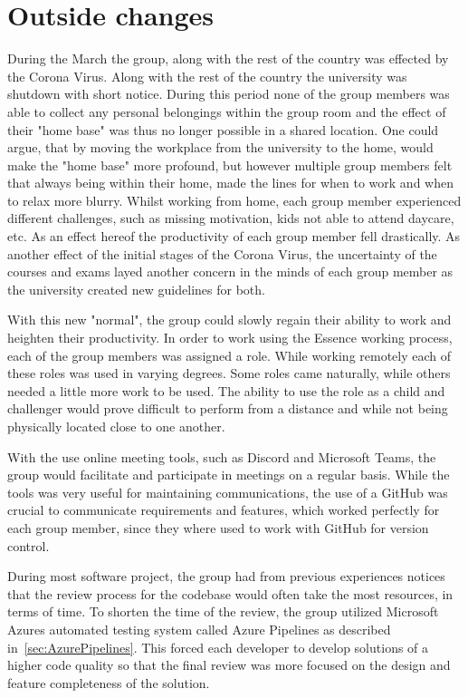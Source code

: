 \section{Outside changes}
During the March the group, along with the rest of the country was effected by the Corona Virus.
Along with the rest of the country the university was shutdown with short notice.
During this period none of the group members was able to collect any personal belongings within the group room and the effect of their "home base" was thus no longer possible in a shared location.
One could argue, that by moving the workplace from the university to the home, would make the "home base" more profound, but however multiple group members felt that always being within their home, made the lines for when to work and when to relax more blurry.
Whilst working from home, each group member experienced different challenges, such as missing motivation, kids not able to attend daycare, etc.
As an effect hereof the productivity of each group member fell drastically.
As another effect of the initial stages of the Corona Virus, the uncertainty of the courses and exams layed another concern in the minds of each group member as the university created new guidelines for both.

With this new "normal", the group could slowly regain their ability to work and heighten their productivity.
In order to work using the Essence working process, each of the group members was assigned a role.
While working remotely each of these roles was used in varying degrees.
Some roles came naturally, while others needed a little more work to be used.
The ability to use the role as a child and challenger would prove difficult to perform from a distance and while not being physically located close to one another. 

With the use online meeting tools, such as Discord and Microsoft Teams, the group would facilitate and participate in meetings on a regular basis.
While the tools was very useful for maintaining communications, the use of a GitHub was crucial to communicate requirements and features, which worked perfectly for each group member, since they where used to work with GitHub for version control.

During most software project, the group had from previous experiences notices that the review process for the codebase would often take the most resources, in terms of time.
To shorten the time of the review, the group utilized Microsoft Azures automated testing system called Azure Pipelines as described in~\autoref{sec:AzurePipelines}.
This forced each developer to develop solutions of a higher code quality so that the final review was more focused on the design and feature completeness of the solution.
